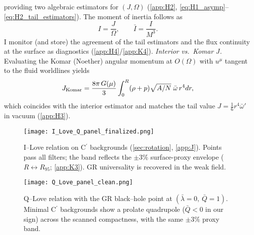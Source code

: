 \documentclass{iopjournal}
\begin{document}
providing two algebraic estimators for \((J,\Omega)\) (\cref{app:H2}, \eqref{eq:H1_asymp}–\eqref{eq:H2_tail_estimators}). The moment of inertia follows as
\begin{equation}
I=\frac{J}{\Omega},\qquad \bar I=\frac{I}{M^{3}}.
\label{eq:12_Ibar}
\end{equation}
I monitor (and store) the agreement of the tail estimators and the flux continuity at the surface as diagnostics (\cref{app:H4}/\cref{app:K4}).
\noindent\emph{Interior vs.\ Komar $J$.}
Evaluating the Komar (Noether) angular momentum at $O(\Omega)$ with $u^\mu$ tangent to the fluid worldlines yields
\[
J_{\rm Komar}=\frac{8\pi\,G(\mu)}{3}\int_{0}^{R}(\rho+p)\sqrt{A/N}\;\bar\omega\,r^{4}dr,
\]
which coincides with the interior estimator and matches the tail value $J=\tfrac{1}{6}r^{4}\bar\omega'$ in vacuum (\cref{app:H3}).

\begin{figure}[t]
\centering
\texttt{[image: I\_Love\_Q\_panel\_finalized.png]}
\caption{I--Love relation on C$^\prime$ backgrounds (\cref{sec:rotation}, \cref{app:J}). Points pass all filters; the band reflects the \(\pm3\%\) surface-proxy envelope (\(R\!\leftrightarrow\!R_{95}\); \cref{app:K3}). GR universality is recovered in the weak field.}
\label{fig:ILove}
\end{figure}

\begin{figure}[t]
\centering
\texttt{[image: Q\_Love\_panel\_clean.png]}%
\caption{Q--Love relation with the GR black--hole point at \((\bar\lambda=0,\ \bar Q=1)\). Minimal C$^\prime$ backgrounds show a prolate quadrupole (\(\bar Q<0\) in our sign) across the scanned compactness, with the same \(\pm3\%\) proxy band.}
\label{fig:QLove}
\end{figure}
\end{document}
